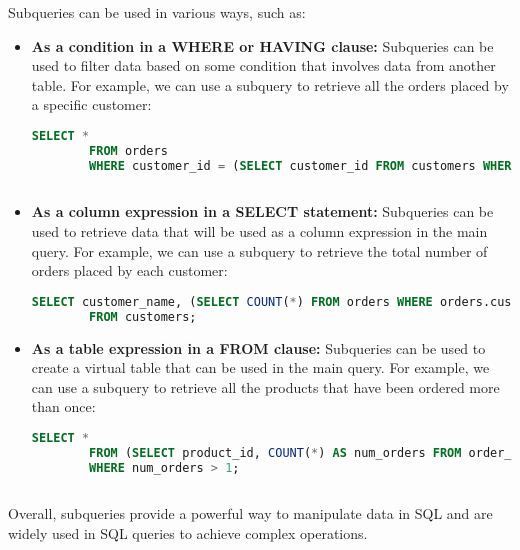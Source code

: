 \documentclass{article}
\begin{document}
Subqueries can be used in various ways, such as:
\begin{itemize}
    \item \textbf{As a condition in a WHERE or HAVING clause:} Subqueries can be used to filter data based on some condition that involves data from another table. For example, we can use a subquery to retrieve all the orders placed by a specific customer:
    \begin{lstlisting}[language=SQL]
        SELECT *
        FROM orders
        WHERE customer_id = (SELECT customer_id FROM customers WHERE customer_name = 'John Doe');
        
    \end{lstlisting}
    \item \textbf{As a column expression in a SELECT statement:} Subqueries can be used to retrieve data that will be used as a column expression in the main query. For example, we can use a subquery to retrieve the total number of orders placed by each customer:
    \begin{lstlisting}[language=SQL]
        SELECT customer_name, (SELECT COUNT(*) FROM orders WHERE orders.customer_id = customers.customer_id) AS num_orders
        FROM customers;
    \end{lstlisting}
    \item \textbf{As a table expression in a FROM clause:} Subqueries can be used to create a virtual table that can be used in the main query. For example, we can use a subquery to retrieve all the products that have been ordered more than once:
    \begin{lstlisting}[language=SQL]
        SELECT *
        FROM (SELECT product_id, COUNT(*) AS num_orders FROM order_details GROUP BY product_id) AS order_counts
        WHERE num_orders > 1;
        
    \end{lstlisting}
\end{itemize}
Overall, subqueries provide a powerful way to manipulate data in SQL and are widely used in SQL queries to achieve complex operations.
\end{document}
